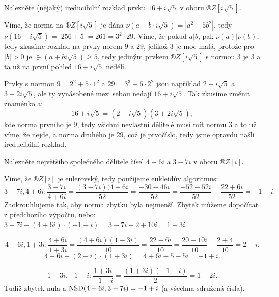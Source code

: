 \documentclass[12pt]{article}                   %
\begin{document}
    \begin{priklad}[3.2]
        Nalezněte (nějaký) ireducibilní rozklad prvku $16 + i\sqrt{5}$ v oboru $®Z[i\sqrt{5}]$.

        \begin{reseni}
            Víme, že norma na $®Z[i\sqrt{5}]$ je dána $\nu(a + b·i\sqrt{5}) = |a^2 + 5b^2|$, tedy $\nu(16 + i\sqrt{5}) = |256 + 5| = 261 = 3^2·29$. Víme, že pokud $a | b$, pak $\nu(a) | \nu(b)$, tedy zkusíme rozklad na prvky norem $9$ a $29$, jelikož $3$ je moc malá, protože pro $|b| > 0$ je $\ni(a+bi\sqrt{5}) ≥ 5$, tedy jediným prvkem $®Z[i\sqrt{5}]$ s normou 3 je 3 a ta už na první pohled $16 + i\sqrt{5}$ nedělí.

            Prvky s normou $9 = 2^2 + 5·1^2$ a $29 = 3^3 + 5·2^2$ jsou například $2 + i\sqrt{5}$ a $3 + 2i\sqrt{5}$, ale ty vynásobené mezi sebou nedají $16 + i\sqrt{5}$. Tak zkusíme změnit znaménko a:
            $$ 16 + i\sqrt{5} = (2 - i\sqrt{5})(3 + 2i\sqrt{5}), $$
            kde norma prvního je $9$, tedy všichni nevlastní dělitelé musí mít normu 3 a to už víme, že nejde, a norma druhého je $29$, což je prvočíslo, tedy jsme opravdu našli ireducibilní rozklad.
        \end{reseni}
    \end{priklad}

\pagebreak

    \begin{priklad}[3.3]
        Nalezněte největšího společného dělitele čísel $4 + 6i$ a $3 − 7i$ v oboru $®Z[i]$.

        \begin{reseni}
            Víme, že $®Z[i]$ je eulerovský, tedy použijeme eukleidův algoritmus:
            $$ 3 - 7i, 4 + 6i: \frac{3 - 7i}{4 + 6i} = \frac{(3-7i)(4-6i}{52} = \frac{-30 - 46i}{52} = \frac{-52 - 52i}{52} + \frac{22 + 6i}{52} ≐ -1 - i. $$
            Zaokrouhlujeme tak, aby norma zbytku byla nejmenší. Zbytek můžeme dopočítat z předchozího výpočtu, nebo: $3 - 7i - (4 + 6i)·(-1-i) = 3 - 7i - 2 + 10i = 1 + 3i$.

            $$ 4 + 6i, 1 + 3i: \frac{4 + 6i}{1 + 3i} = \frac{(4 + 6i)(1-3i)}{10} = \frac{22 - 6i}{10} = \frac{20 - 10i}{10} + \frac{2 + 4}{10} ≐ 2 - i. $$
            $$ 4 + 6i - (2 - i)·(1 + 3i) = 4 + 6i - 5 - 5i = -1 + i. $$

            $$ 1 + 3i, -1 + i: \frac{1 + 3i}{-1 + i} = \frac{(1 + 3i)(-1 - i)}{2} = 1 - 2i. $$ 
            Tudíž zbytek nula a $\operatorname{NSD}(4+6i, 3-7i) = -1 + i$ (a všechna sdružená čísla).
        \end{reseni}
    \end{priklad}
\end{document}
